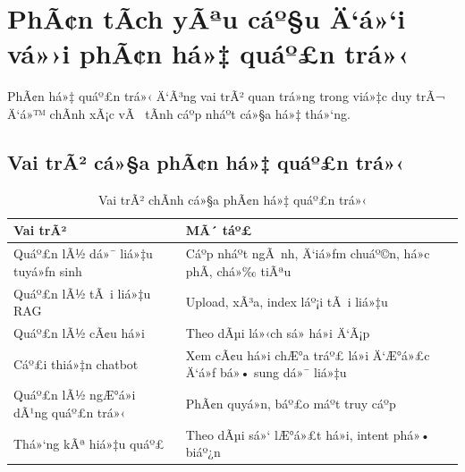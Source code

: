 ﻿\documentclass[12pt,a4paper]{report}
\begin{document}
% 
\section{PhÃ¢n tÃ­ch yÃªu cáº§u Ä‘á»‘i vá»›i phÃ¢n há»‡ quáº£n trá»‹}

PhÃ¢n há»‡ quáº£n trá»‹ Ä‘Ã³ng vai trÃ² quan trá»ng trong viá»‡c duy trÃ¬ Ä‘á»™ chÃ­nh xÃ¡c vÃ  tÃ­nh cáº­p nháº­t cá»§a há»‡ thá»‘ng.

\subsection{Vai trÃ² cá»§a phÃ¢n há»‡ quáº£n trá»‹}
\begin{table}[H]
\centering
\caption{Vai trÃ² chÃ­nh cá»§a phÃ¢n há»‡ quáº£n trá»‹}
\label{tab:admin_module_roles}
\begin{tabular}{|p{4cm}|p{8cm}|}
\hline
\textbf{Vai trÃ²} & \textbf{MÃ´ táº£} \\ \hline
Quáº£n lÃ½ dá»¯ liá»‡u tuyá»ƒn sinh & Cáº­p nháº­t ngÃ nh, Ä‘iá»ƒm chuáº©n, há»c phÃ­, chá»‰ tiÃªu \\ \hline
Quáº£n lÃ½ tÃ i liá»‡u RAG & Upload, xÃ³a, index láº¡i tÃ i liá»‡u \\ \hline
Quáº£n lÃ½ cÃ¢u há»i & Theo dÃµi lá»‹ch sá»­ há»i Ä‘Ã¡p \\ \hline
Cáº£i thiá»‡n chatbot & Xem cÃ¢u há»i chÆ°a tráº£ lá»i Ä‘Æ°á»£c Ä‘á»ƒ bá»• sung dá»¯ liá»‡u \\ \hline
Quáº£n lÃ½ ngÆ°á»i dÃ¹ng quáº£n trá»‹ & PhÃ¢n quyá»n, báº£o máº­t truy cáº­p \\ \hline
Thá»‘ng kÃª hiá»‡u quáº£ & Theo dÃµi sá»‘ lÆ°á»£t há»i, intent phá»• biáº¿n \\ \hline
\end{tabular}
\end{table}
\end{document}
